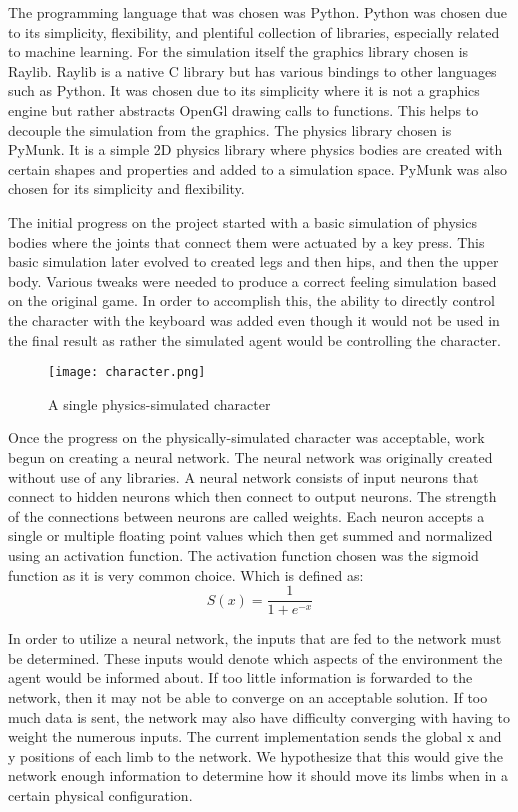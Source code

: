 \documentclass[letterpaper]{article} %
\begin{document}
\par The programming language that was chosen was Python. Python was chosen due to its simplicity, flexibility, and plentiful collection of libraries, especially related to machine learning. For the simulation itself the graphics library chosen is Raylib. Raylib is a native C library but has various bindings to other languages such as Python. It was chosen due to its simplicity where it is not a graphics engine but rather abstracts OpenGl drawing calls to functions. This helps to decouple the simulation from the graphics. The physics library chosen is PyMunk. It is a simple 2D physics library where physics bodies are created with certain shapes and properties and added to a simulation space. PyMunk was also chosen for its simplicity and flexibility.

\par The initial progress on the project started with a basic simulation of physics bodies where the joints that connect them were actuated by a key press. This basic simulation later evolved to created legs and then hips, and then the upper body. Various tweaks were needed to produce a correct feeling simulation based on the original game. In order to accomplish this, the ability to directly control the character with the keyboard was added even though it would not be used in the final result as rather the simulated agent would be controlling the character. 

\begin{figure}[h]
\caption{A single physics-simulated character}
\centering
\texttt{[image: character.png]}
\end{figure}

\par Once the progress on the physically-simulated character was acceptable, work begun on creating a neural network. The neural network was originally created without use of any libraries. A neural network consists of input neurons that connect to hidden neurons which then connect to output neurons. The strength of the connections between neurons are called weights. Each neuron accepts a single or multiple floating point values which then get summed and normalized using an activation function. The activation function chosen was the sigmoid function as it is very common choice. Which is defined as:
$$
S(x)=\frac{1}{1+e^{-x}}
$$
\par In order to utilize a neural network, the inputs that are fed to the network must be determined. These inputs would denote which aspects of the environment the agent would be informed about. If too little information is forwarded to the network, then it may not be able to converge on an acceptable solution. If too much data is sent, the network may also have difficulty converging with having to weight the numerous inputs. The current implementation sends the global x and y positions of each limb to the network. We hypothesize that this would give the network enough information to determine how it should move its limbs when in a certain physical configuration.
\end{document}
